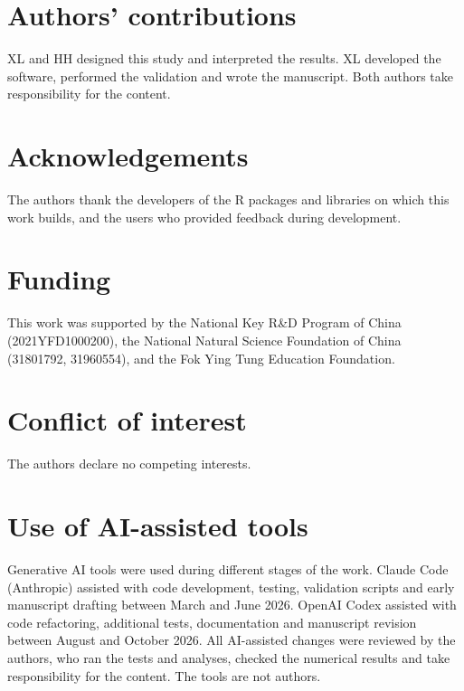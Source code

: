 \section*{Authors' contributions}
XL and HH designed this study and interpreted the results. XL developed the
software, performed the validation and wrote the manuscript. Both authors take
responsibility for the content.

\section*{Acknowledgements}
The authors thank the developers of the R packages and libraries on which
this work builds, and the users who provided feedback during development.

\section*{Funding}
{\sloppy This work was supported by the National Key R\&D Program of China
(2021YFD1000200), the National Natural Science Foundation of China
(31801792, 31960554), and the Fok Ying Tung Education Foundation.\par}

\section*{Conflict of interest}
The authors declare no competing interests.

\section*{Use of AI-assisted tools}
Generative AI tools were used during different stages of the work. Claude Code
(Anthropic) assisted with code development, testing, validation scripts and
early manuscript drafting between March and June 2026. OpenAI Codex assisted
with code refactoring, additional tests, documentation and manuscript
revision between August and October 2026. All AI-assisted changes were
reviewed by the authors, who ran the tests and analyses, checked the numerical
results and take responsibility for the content. The tools are not authors.
